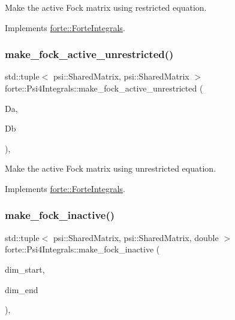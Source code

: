 Make the active Fock matrix using restricted equation. 



Implements \mbox{\hyperlink{classforte_1_1_forte_integrals_a9e2f6f24d734aa04784dfc46d3f031ae}{forte\+::\+Forte\+Integrals}}.

\mbox{\label{classforte_1_1_psi4_integrals_a42f39301293e0b8048412cb833420797}} 
\subsubsection{\texorpdfstring{make\+\_\+fock\+\_\+active\+\_\+unrestricted()}{make\_fock\_active\_unrestricted()}}
{\footnotesize\ttfamily std\+::tuple$<$ psi\+::\+Shared\+Matrix, psi\+::\+Shared\+Matrix $>$ forte\+::\+Psi4\+Integrals\+::make\+\_\+fock\+\_\+active\+\_\+unrestricted (\begin{DoxyParamCaption}\item[{psi\+::\+Shared\+Matrix}]{Da,  }\item[{psi\+::\+Shared\+Matrix}]{Db }\end{DoxyParamCaption})\hspace{0.3cm}{\ttfamily [override]}, {\ttfamily [virtual]}}



Make the active Fock matrix using unrestricted equation. 



Implements \mbox{\hyperlink{classforte_1_1_forte_integrals_a3bc94f56104d72581629d9d6a6a3a74c}{forte\+::\+Forte\+Integrals}}.

\mbox{\label{classforte_1_1_psi4_integrals_ac867cd8004611a1fe93c31f1068ad81c}} 
\subsubsection{\texorpdfstring{make\+\_\+fock\+\_\+inactive()}{make\_fock\_inactive()}}
{\footnotesize\ttfamily std\+::tuple$<$ psi\+::\+Shared\+Matrix, psi\+::\+Shared\+Matrix, double $>$ forte\+::\+Psi4\+Integrals\+::make\+\_\+fock\+\_\+inactive (\begin{DoxyParamCaption}\item[{psi\+::\+Dimension}]{dim\+\_\+start,  }\item[{psi\+::\+Dimension}]{dim\+\_\+end }\end{DoxyParamCaption})\hspace{0.3cm}{\ttfamily [override]}, {\ttfamily [virtual]}}



